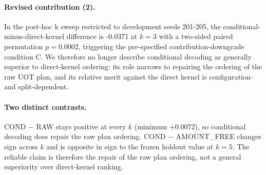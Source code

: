 \paragraph{Revised contribution (2).}
In the post-hoc k sweep restricted to development seeds 201-205, the conditional-minus-direct-kernel difference is -0.0371 at $k=3$ with a two-sided paired permutation $p = 0.0002$, triggering the pre-specified contribution-downgrade condition C. We therefore no longer describe conditional decoding as generally superior to direct-kernel ordering: its role narrows to repairing the ordering of the raw UOT plan, and its relative merit against the direct kernel is configuration- and split-dependent.

\paragraph{Two distinct contrasts.}
COND $-$ RAW stays positive at every $k$ (minimum $+0.0072$), so conditional decoding does repair the raw plan ordering. COND $-$ AMOUNT\_FREE changes sign across $k$ and is opposite in sign to the frozen holdout value at $k=5$. The reliable claim is therefore the repair of the raw plan ordering, not a general superiority over direct-kernel ranking.
